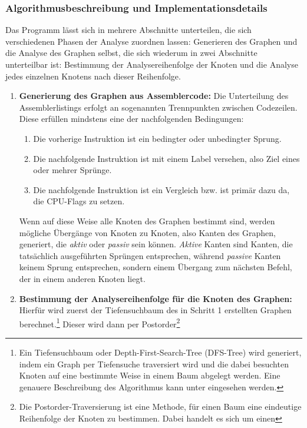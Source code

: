 \documentclass[11pt]{article}
\begin{document}
\subsubsection{Algorithmusbeschreibung und Implementationsdetails} Das Programm lässt sich in
mehrere Abschnitte unterteilen, die sich verschiedenen Phasen der Analyse zuordnen lassen:
Generieren des Graphen und die Analyse des Graphen selbst, die sich wiederum in zwei Abschnitte
unterteilbar ist: Bestimmung der Analysereihenfolge der Knoten und die Analyse jedes einzelnen
Knotens nach dieser Reihenfolge.
\begin{enumerate}
	\item{\textbf{Generierung des Graphen aus Assemblercode:}}
		Die Unterteilung des Assemblerlistings erfolgt an sogenannten Trennpunkten
		zwischen Codezeilen.
		Diese erfüllen mindstens eine der nachfolgenden Bedingungen:
		\begin{enumerate}
			\item{Die vorherige Instruktion ist ein bedingter oder unbedingter Sprung.}
			\item{Die nachfolgende Instruktion ist mit einem Label versehen,
				also Ziel eines oder mehrer Sprünge.}
			\item{Die nachfolgende Instruktion ist ein Vergleich bzw. ist primär dazu da,
                die CPU-Flags zu setzen.}
		\end{enumerate}
		Wenn auf diese Weise alle Knoten des Graphen bestimmt sind, werden mögliche Übergänge von
		Knoten zu Knoten, also Kanten des Graphen, generiert, die \textit{aktiv} oder
		\textit{passiv} sein können. \textit{Aktive} Kanten sind Kanten, die
		tatsächlich ausgeführten Sprüngen entsprechen, während \textit{passive}
		Kanten keinem Sprung entsprechen, sondern einem Übergang zum nächsten Befehl,
		der in einem anderen Knoten liegt.
	\item{\textbf{Bestimmung der Analysereihenfolge für die Knoten des Graphen:}} Hierfür wird
		zuerst der Tiefensuchbaum des in Schritt 1 erstellten Graphen berechnet.\footnote{
			Ein Tiefensuchbaum oder Depth-First-Search-Tree (DFS-Tree) wird generiert,
			indem ein Graph per Tiefensuche traversiert wird und die dabei besuchten
			Knoten auf eine bestimmte Weise in einem  Baum abgelegt werden. Eine genauere
			Beschreibung des Algorithmus kann unter \cite{wiki2:5} eingesehen werden.
		}
		Dieser wird dann per Postorder\footnote{
			Die Postorder-Traversierung ist eine Methode, für einen Baum eine eindeutige
			Reihenfolge der Knoten zu bestimmen. Dabei handelt es sich um einen
}
\end{enumerate}
\end{document}
